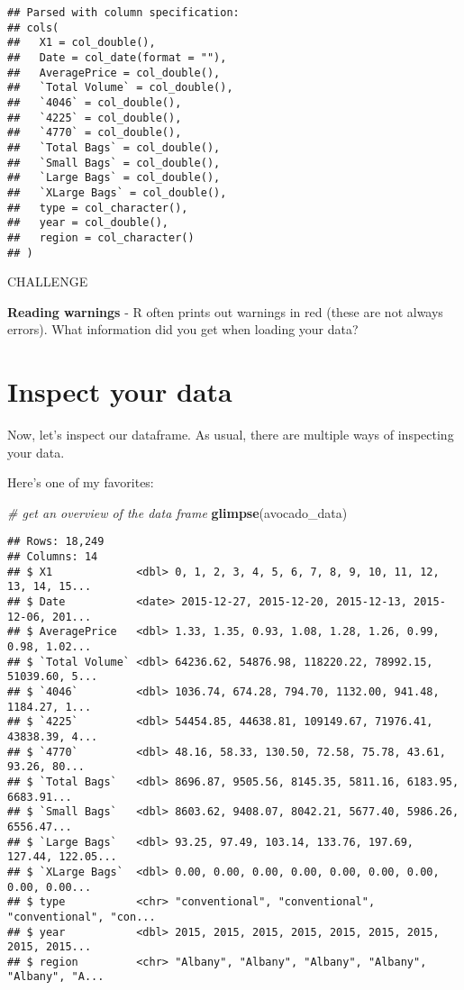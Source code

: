 \documentclass[]{book}
\newenvironment{Shaded}{\begin{snugshade}}{\end{snugshade}}
\newcommand{\CommentTok}[1]{\textcolor[rgb]{0.56,0.35,0.01}{\textit{#1}}}
\newcommand{\KeywordTok}[1]{\textcolor[rgb]{0.13,0.29,0.53}{\textbf{#1}}}
\newcommand{\NormalTok}[1]{#1}
\begin{document}
\begin{verbatim}
## Parsed with column specification:
## cols(
##   X1 = col_double(),
##   Date = col_date(format = ""),
##   AveragePrice = col_double(),
##   `Total Volume` = col_double(),
##   `4046` = col_double(),
##   `4225` = col_double(),
##   `4770` = col_double(),
##   `Total Bags` = col_double(),
##   `Small Bags` = col_double(),
##   `Large Bags` = col_double(),
##   `XLarge Bags` = col_double(),
##   type = col_character(),
##   year = col_double(),
##   region = col_character()
## )
\end{verbatim}

\leavevmode\hypertarget{challenge}{}%
CHALLENGE

\textbf{Reading warnings} - R often prints out warnings in red (these are not always errors). What information did you get when loading your data?

\hypertarget{inspect-your-data}{%
\section{Inspect your data}\label{inspect-your-data}}

Now, let's inspect our dataframe. As usual, there are multiple ways of inspecting your data.

Here's one of my favorites:

\begin{Shaded}
\begin{Highlighting}[]
\CommentTok{# get an overview of the data frame}
\KeywordTok{glimpse}\NormalTok{(avocado_data)}
\end{Highlighting}
\end{Shaded}

\begin{verbatim}
## Rows: 18,249
## Columns: 14
## $ X1             <dbl> 0, 1, 2, 3, 4, 5, 6, 7, 8, 9, 10, 11, 12, 13, 14, 15...
## $ Date           <date> 2015-12-27, 2015-12-20, 2015-12-13, 2015-12-06, 201...
## $ AveragePrice   <dbl> 1.33, 1.35, 0.93, 1.08, 1.28, 1.26, 0.99, 0.98, 1.02...
## $ `Total Volume` <dbl> 64236.62, 54876.98, 118220.22, 78992.15, 51039.60, 5...
## $ `4046`         <dbl> 1036.74, 674.28, 794.70, 1132.00, 941.48, 1184.27, 1...
## $ `4225`         <dbl> 54454.85, 44638.81, 109149.67, 71976.41, 43838.39, 4...
## $ `4770`         <dbl> 48.16, 58.33, 130.50, 72.58, 75.78, 43.61, 93.26, 80...
## $ `Total Bags`   <dbl> 8696.87, 9505.56, 8145.35, 5811.16, 6183.95, 6683.91...
## $ `Small Bags`   <dbl> 8603.62, 9408.07, 8042.21, 5677.40, 5986.26, 6556.47...
## $ `Large Bags`   <dbl> 93.25, 97.49, 103.14, 133.76, 197.69, 127.44, 122.05...
## $ `XLarge Bags`  <dbl> 0.00, 0.00, 0.00, 0.00, 0.00, 0.00, 0.00, 0.00, 0.00...
## $ type           <chr> "conventional", "conventional", "conventional", "con...
## $ year           <dbl> 2015, 2015, 2015, 2015, 2015, 2015, 2015, 2015, 2015...
## $ region         <chr> "Albany", "Albany", "Albany", "Albany", "Albany", "A...
\end{verbatim}
\end{document}
